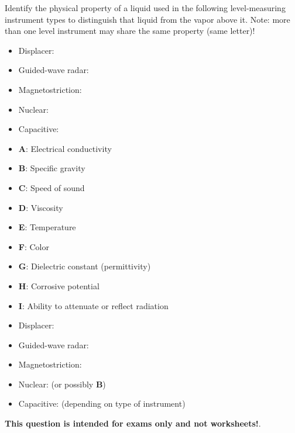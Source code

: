 

Identify the physical property of a liquid used in the following level-measuring instrument types to distinguish that liquid from the vapor above it.  Note: more than one level instrument may share the same property (same letter)!

\begin{itemize}
\item{} Displacer: \underbar{\hskip 50pt}
\item{} Guided-wave radar: \underbar{\hskip 50pt}
\item{} Magnetostriction: \underbar{\hskip 50pt}
\item{} Nuclear: \underbar{\hskip 50pt}
\item{} Capacitive: \underbar{\hskip 50pt}
\end{itemize}

\vskip 10pt

\begin{itemize}
\item {\bf A}: Electrical conductivity
\item {\bf B}: Specific gravity
\item {\bf C}: Speed of sound
\item {\bf D}: Viscosity
\item {\bf E}: Temperature
\item {\bf F}: Color
\item {\bf G}: Dielectric constant (permittivity)
\item {\bf H}: Corrosive potential
\item {\bf I}: Ability to attenuate or reflect radiation
\end{itemize}







\begin{itemize}
\item{} Displacer: 
\item{} Guided-wave radar: 
\item{} Magnetostriction: 
\item{} Nuclear:  (or possibly {\bf B})
\item{} Capacitive:  (depending on type of instrument)
\end{itemize}







{\bf This question is intended for exams only and not worksheets!}.



